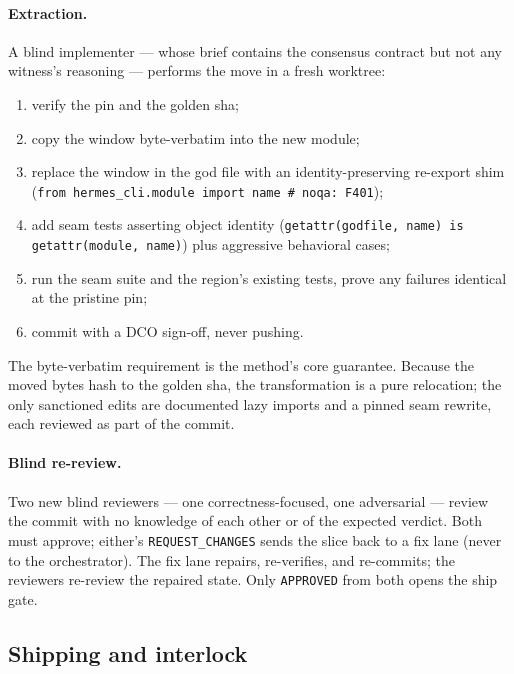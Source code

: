 \documentclass[11pt]{article}
\theoremstyle{definition}
\theoremstyle{plain}
\theoremstyle{remark}
\begin{document}
\paragraph{Extraction.}
A blind implementer --- whose brief contains the consensus contract but not
any witness's reasoning --- performs the move in a fresh worktree:
\begin{enumerate}[leftmargin=*]
\item verify the pin and the golden sha;
\item copy the window byte-verbatim into the new module;
\item replace the window in the god file with an identity-preserving
  re-export shim (\texttt{from hermes\_cli.module import name \# noqa: F401});
\item add seam tests asserting object identity (\texttt{getattr(godfile,
  name) is getattr(module, name)}) plus aggressive behavioral cases;
\item run the seam suite and the region's existing tests, prove any failures
  identical at the pristine pin;
\item commit with a DCO sign-off, never pushing.
\end{enumerate}

The byte-verbatim requirement is the method's core guarantee. Because the
moved bytes hash to the golden sha, the transformation is a pure relocation;
the only sanctioned edits are documented lazy imports and a pinned seam
rewrite, each reviewed as part of the commit.

\paragraph{Blind re-review.}
Two new blind reviewers --- one correctness-focused, one adversarial ---
review the commit with no knowledge of each other or of the expected
verdict. Both must approve; either's \texttt{REQUEST\_CHANGES} sends the
slice back to a fix lane (never to the orchestrator). The fix lane repairs,
re-verifies, and re-commits; the reviewers re-review the repaired state.
Only \texttt{APPROVED} from both opens the ship gate.

\subsection{Shipping and interlock}
\end{document}
